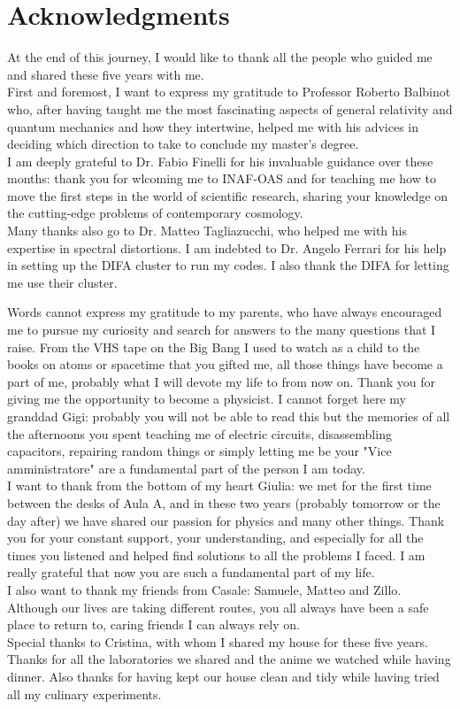 \newpage
\section*{Acknowledgments}
At the end of this journey, I would like to thank all the people who guided me and shared these five years with me.\\
First and foremost, I want to express my gratitude to Professor Roberto Balbinot who, after having taught me the most fascinating aspects of general relativity and quantum mechanics and how they intertwine, helped me with his advices in deciding which direction to take to conclude my master's degree.\\
I am deeply grateful to Dr. Fabio Finelli for his invaluable guidance over these months: thank you for wlcoming me to INAF-OAS and for teaching me how to move the first steps in the world of scientific research, sharing your knowledge on the cutting-edge problems of contemporary cosmology. \\
Many thanks also go to Dr. Matteo Tagliazucchi, who helped me with his expertise in spectral distortions. I am indebted to Dr. Angelo Ferrari for his help in setting up the DIFA cluster to run my codes. I also thank the DIFA for letting me use their cluster.

Words cannot express my gratitude to my parents, who have always encouraged me to pursue my curiosity and search for answers to the many questions that I raise. From the VHS tape on the Big Bang I used to watch  as a child to the books on atoms or spacetime that you gifted me, all those things have become a part of me, probably what I will devote my life to from now on. Thank you for giving me the opportunity to become a physicist. I cannot forget here my granddad Gigi: probably you will not be able to read this but the memories of all the afternoons you spent teaching me of electric circuits, disassembling capacitors, repairing random things or simply letting me be your "Vice amministratore" are a fundamental part of the person I am today.\\
I want to thank from the bottom of my heart Giulia: we met for the first time between the desks of Aula A, and in these two years (probably tomorrow or the day after) we have shared our passion for physics and many other things. Thank you for your constant support, your understanding, and especially for all the times you listened and helped find solutions to all the problems I faced. I am really grateful that now you are such a fundamental part of my life.\\
I also want to thank my friends from Casale: Samuele, Matteo and Zillo. Although our lives are taking different routes, you all always have been a safe place to return to, caring friends I can always rely on.\\
Special thanks to Cristina, with whom I shared my house for these five years. Thanks for all the laboratories we shared and the anime we watched while having dinner. Also thanks for having kept our house clean and tidy while having tried all my culinary experiments. 

